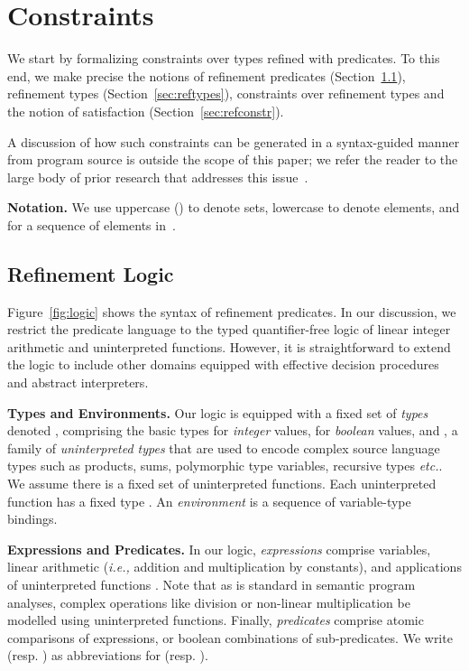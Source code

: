 \documentclass[nocopyrightspace]{sigplanconf}
\def\mypara#1{\smallskip\noindent\textbf{#1}}
\newcommand{\ie}{\textit{i.e.,}\xspace}
\def\etc{{\it etc.}}
\begin{document}
\section{Constraints}\label{sec:constraints}

We start by formalizing constraints over types refined with predicates. 
To this end, we make precise the notions of 
refinement predicates (Section~\ref{sec:logic}),
refinement types 
(Section~\ref{sec:reftypes}),
constraints over refinement types 
and the notion of satisfaction 
(Section~\ref{sec:refconstr}).

A discussion of how such constraints can be generated in a syntax-guided
manner from program source
is outside the scope of this paper; we refer the reader to the large body
of prior research that addresses this 
issue~\cite{XiPfenning99,Knowles07,LiquidPLDI08,GordonRefinement09}.

\mypara{Notation.}
We use uppercase () to denote sets, lowercase  to denote
elements, and  for a sequence of elements in~. 

\subsection{Refinement Logic}
\label{sec:logic}

Figure~\ref{fig:logic} shows the syntax of refinement predicates. 
In our discussion, we restrict the predicate language to the typed quantifier-free
logic of linear integer arithmetic and uninterpreted functions.
However, it is straightforward to extend the logic to include 
other domains equipped with effective decision procedures 
and abstract interpreters.

\mypara{Types and Environments.}
Our logic is equipped with a fixed 
set of \emph{types} denoted , 
comprising the basic types
 for \emph{integer} values, 
 for \emph{boolean} values,
and , a family of \emph{uninterpreted types} that are used to
encode complex source language types such as products, sums, polymorphic 
type variables, recursive types \etc.
We assume there is a fixed set of uninterpreted functions.
Each uninterpreted function  has a fixed type 
.
An \emph{environment} is a sequence of variable-type bindings.

\mypara{Expressions and Predicates.}
In our logic, \emph{expressions}  comprise variables, linear arithmetic
(\ie addition and multiplication by constants), and applications of 
uninterpreted functions . 
Note that as is standard in semantic program analyses, complex
operations like division or non-linear multiplication be modelled using 
uninterpreted functions.
Finally, \emph{predicates} comprise atomic comparisons of expressions, or
boolean combinations of sub-predicates.
We write  (resp. ) as abbreviations for  (resp. ).
\end{document}
